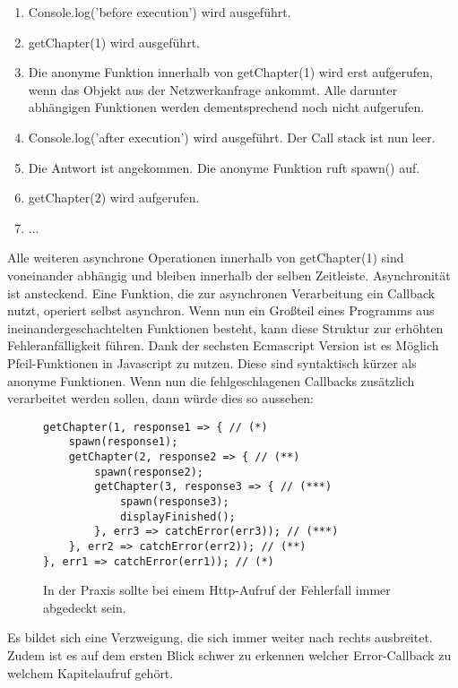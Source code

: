 \begin{enumerate}
    \item Console.log('before execution') wird ausgeführt.
    \item getChapter(1) wird ausgeführt.
    \item Die anonyme Funktion innerhalb von getChapter(1) wird erst aufgerufen, wenn das Objekt aus der Netzwerkanfrage ankommt. Alle darunter abhängigen Funktionen werden dementsprechend noch nicht aufgerufen.
    \item Console.log('after execution') wird ausgeführt. Der Call stack ist nun leer.
    \item Die Antwort ist angekommen. Die anonyme Funktion ruft spawn() auf.
    \item getChapter(2) wird aufgerufen.
    \item ...
\end{enumerate}

\noindent
Alle weiteren asynchrone Operationen innerhalb von getChapter(1) sind voneinander abhängig und bleiben innerhalb der selben Zeitleiste. Asynchronität ist ansteckend. Eine Funktion, die zur asynchronen Verarbeitung ein Callback nutzt, operiert selbst asynchron. Wenn nun ein Großteil eines Programms aus ineinandergeschachtelten Funktionen besteht, kann diese Struktur zur erhöhten Fehleranfälligkeit führen. Dank der sechsten Ecmascript Version ist es Möglich Pfeil-Funktionen in Javascript zu nutzen. Diese sind syntaktisch kürzer als anonyme Funktionen. Wenn nun die fehlgeschlagenen Callbacks zusätzlich verarbeitet werden sollen, dann würde dies so aussehen:

\begin{figure}[H]
\begin{lstlisting}[basicstyle=\small]
getChapter(1, response1 => { // (*)
    spawn(response1);
    getChapter(2, response2 => { // (**)
        spawn(response2);
        getChapter(3, response3 => { // (***)
            spawn(response3);
            displayFinished();
        }, err3 => catchError(err3)); // (***)
    }, err2 => catchError(err2)); // (**)
}, err1 => catchError(err1)); // (*)
\end{lstlisting}
\caption{In der Praxis sollte bei einem Http-Aufruf der Fehlerfall immer abgedeckt sein.}
\label{Nested-Callback-with-catch-error}
\end{figure}

\noindent
Es bildet sich eine Verzweigung, die sich immer weiter nach rechts ausbreitet. Zudem ist es auf dem ersten Blick schwer zu erkennen welcher Error-Callback zu welchem Kapitelaufruf gehört.\\

